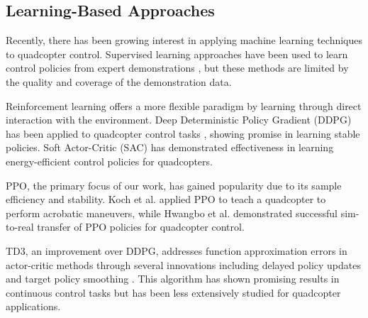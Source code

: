 \documentclass[12pt]{article}
\begin{document}
\subsection{Learning-Based Approaches}

Recently, there has been growing interest in applying machine learning techniques to quadcopter control. Supervised learning approaches have been used to learn control policies from expert demonstrations \cite{zhang2016learning}, but these methods are limited by the quality and coverage of the demonstration data.


Reinforcement learning offers a more flexible paradigm by learning through direct interaction with the environment. Deep Deterministic Policy Gradient (DDPG) has been applied to quadcopter control tasks \cite{hwangbo2017ddpg}, showing promise in learning stable policies. Soft Actor-Critic (SAC) \cite{ha2020sac} has demonstrated effectiveness in learning energy-efficient control policies for quadcopters.


PPO, the primary focus of our work, has gained popularity due to its sample efficiency and stability. Koch et al. \cite{koch2019ppo} applied PPO to teach a quadcopter to perform acrobatic maneuvers, while Hwangbo et al. \cite{hwangbo2019learning} demonstrated successful sim-to-real transfer of PPO policies for quadcopter control.


TD3, an improvement over DDPG, addresses function approximation errors in actor-critic methods through several innovations including delayed policy updates and target policy smoothing \cite{fujimoto2018td3}. This algorithm has shown promising results in continuous control tasks but has been less extensively studied for quadcopter applications.

\end{document}
